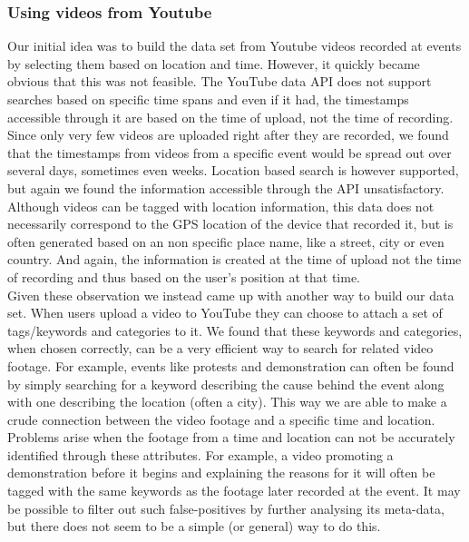 \subsubsection{Using videos from Youtube}
%
Our initial idea was to build the data set from Youtube videos recorded at events by selecting them based on location and time. However, it quickly became obvious that this was not feasible. The YouTube data API does not support searches based on specific time spans and even if it had, the timestamps accessible through it are based on the time of upload, not the time of recording. Since only very few videos are uploaded right after they are recorded, we found that the timestamps from videos from a specific event would be spread out over several days, sometimes even weeks. Location based search is however supported, but again we found the information accessible through the API unsatisfactory. Although videos can be tagged with location information, this data does not necessarily correspond to the GPS location of the device that recorded it, but is often generated based on an non specific place name, like a street, city or even country. And again, the information is created at the time of upload not the time of recording and thus based on the user's position at that time.\\
Given these observation we instead came up with another way to build our data set. When users upload a video to YouTube they can choose to attach a set of tags/keywords and categories to it. We found that these keywords and categories, when chosen correctly, can be a very efficient way to search for related video footage. For example, events like protests and demonstration can often be found by simply searching for a keyword describing the cause behind the event along with one describing the location (often a city). This way we are able to make a crude connection between the video footage and a specific time and location. Problems arise when the footage from a time and location can not be accurately identified through these attributes. For example, a video promoting a demonstration before it begins and explaining the reasons for it will often be tagged with the same keywords as the footage later recorded at the event. It may be possible to filter out such false-positives by further analysing its meta-data, but there does not seem to be a simple (or general) way to do this.
%
